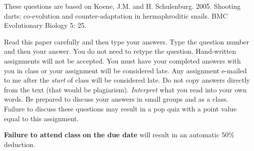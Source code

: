 \documentclass[11pt, addpoints]{exam}
\begin{document}
These questions are based on Koene, J.M. and H. Schulenburg. 2005. Shooting darts: co-evolution and
counter-adaptation in hermaphroditic snails. BMC Evolutionary Biology 5:
25.

Read this paper carefully and then type your answers. Type the question number and then your answer. You do not need to retype the question. Hand-written
assignments will not be accepted. You must have your completed answers
with you in class or your assignment will be considered late. Any
assignment e-mailed to me after the \emph{start} of class will be
considered late. Do not copy answers directly from the text (that would
be plagiarism). \emph{Interpret} what you read into your own words. Be
prepared to discuss your answers in small groups and as a class. Failure
to discuss these questions may result in a pop quiz with a point value
equal to this assignment.

\textbf{Failure to attend} \textbf{class} \textbf{on the due date} will
result in an automatic 50\% deduction.
\end{document}
